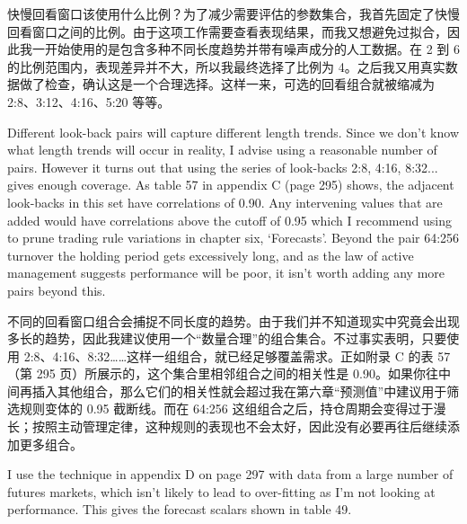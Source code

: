 \begin{chineseblock}快慢回看窗口该使用什么比例？为了减少需要评估的参数集合，我首先固定了快慢回看窗口之间的比例。由于这项工作需要查看表现结果，而我又想避免过拟合，因此我一开始使用的是包含多种不同长度趋势并带有噪声成分的人工数据。在 2 到 6 的比例范围内，表现差异并不大，所以我最终选择了比例为 4。之后我又用真实数据做了检查，确认这是一个合理选择。这样一来，可选的回看组合就被缩减为 2:8、3:12、4:16、5:20 等等。\end{chineseblock}


\begin{englishblock} Different look-back pairs will capture different length trends. Since we don't know what length trends will occur in reality, I advise using a reasonable number of pairs. However it turns out that using the series of look-backs 2:8, 4:16, 8:32... gives enough coverage. As table 57 in appendix C (page 295) shows, the adjacent look-backs in this set have correlations of 0.90. Any intervening values that are added would have correlations above the cutoff of 0.95 which I recommend using to prune trading rule variations in chapter six, ‘Forecasts'. Beyond the pair 64:256 turnover the holding period gets excessively long, and as the law of active management suggests performance will be poor, it isn't worth adding any more pairs beyond this. \end{englishblock}

\begin{chineseblock}不同的回看窗口组合会捕捉不同长度的趋势。由于我们并不知道现实中究竟会出现多长的趋势，因此我建议使用一个“数量合理”的组合集合。不过事实表明，只要使用 2:8、4:16、8:32……这样一组组合，就已经足够覆盖需求。正如附录 C 的表 57（第 295 页）所展示的，这个集合里相邻组合之间的相关性是 0.90。如果你往中间再插入其他组合，那么它们的相关性就会超过我在第六章“预测值”中建议用于筛选规则变体的 0.95 截断线。而在 64:256 这组组合之后，持仓周期会变得过于漫长；按照主动管理定律，这种规则的表现也不会太好，因此没有必要再往后继续添加更多组合。\end{chineseblock}


\begin{englishblock} I use the technique in appendix D on page 297 with data from a large number of futures markets, which isn't likely to lead to over-fitting as I'm not looking at performance. This gives the forecast scalars shown in table 49. \end{englishblock}

